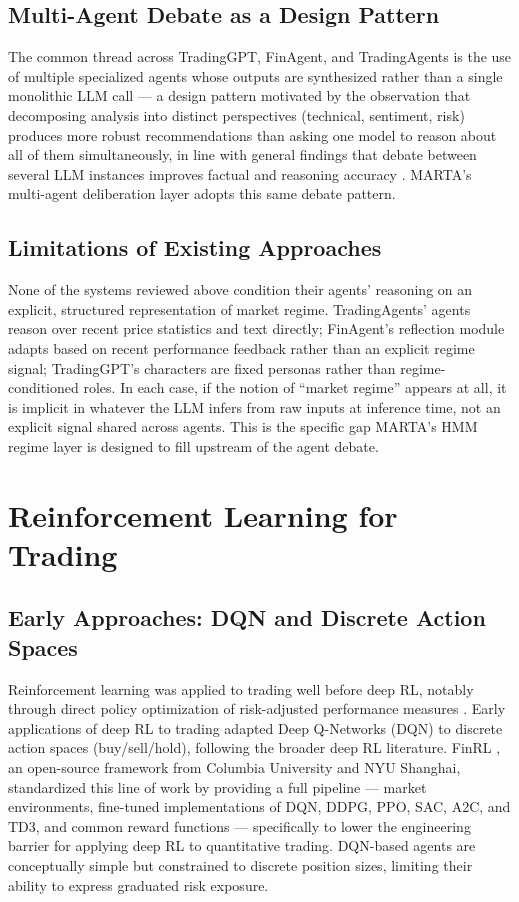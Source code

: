 \subsection{Multi-Agent Debate as a Design Pattern}
\label{subsec:multi-agent-debate}

The common thread across TradingGPT, FinAgent, and TradingAgents is the use of multiple specialized agents whose outputs are synthesized rather than a single monolithic LLM call --- a design pattern motivated by the observation that decomposing analysis into distinct perspectives (technical, sentiment, risk) produces more robust recommendations than asking one model to reason about all of them simultaneously, in line with general findings that debate between several LLM instances improves factual and reasoning accuracy \cite{du2023debate}. MARTA's multi-agent deliberation layer adopts this same debate pattern.

\subsection{Limitations of Existing Approaches}
\label{subsec:llm-limitations}

None of the systems reviewed above condition their agents' reasoning on an explicit, structured representation of market regime. TradingAgents' agents reason over recent price statistics and text directly; FinAgent's reflection module adapts based on recent performance feedback rather than an explicit regime signal; TradingGPT's characters are fixed personas rather than regime-conditioned roles. In each case, if the notion of ``market regime'' appears at all, it is implicit in whatever the LLM infers from raw inputs at inference time, not an explicit signal shared across agents. This is the specific gap MARTA's HMM regime layer is designed to fill upstream of the agent debate.

\section{Reinforcement Learning for Trading}
\label{sec:rl-trading}

\subsection{Early Approaches: DQN and Discrete Action Spaces}
\label{subsec:rl-dqn}

Reinforcement learning was applied to trading well before deep RL, notably through direct policy optimization of risk-adjusted performance measures \cite{moody2001}. Early applications of deep RL to trading adapted Deep Q-Networks (DQN) \cite{mnih2015} to discrete action spaces (buy/sell/hold), following the broader deep RL literature. FinRL \cite{finrl2020}, an open-source framework from Columbia University and NYU Shanghai, standardized this line of work by providing a full pipeline --- market environments, fine-tuned implementations of DQN, DDPG, PPO, SAC, A2C, and TD3, and common reward functions --- specifically to lower the engineering barrier for applying deep RL to quantitative trading. DQN-based agents are conceptually simple but constrained to discrete position sizes, limiting their ability to express graduated risk exposure.

